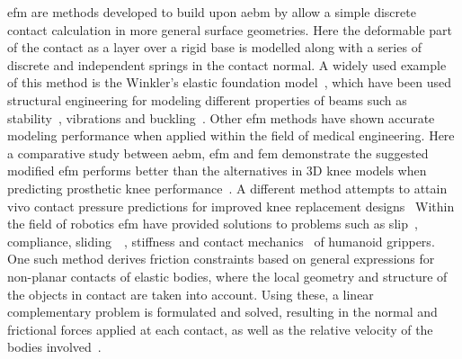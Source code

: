 \gls{efm} are methods developed to build upon \gls{aebm} by allow a simple discrete contact calculation in more general surface geometries. Here the deformable part of the contact as a layer over a rigid base is modelled along with a series of discrete and independent springs in the contact normal. A widely used example of this method is the Winkler's elastic foundation model~\cite{kl-johnson-and-contact-mechanics}, which have been used structural engineering for modeling different properties of beams such as stability~\cite{stability-of-a-timoshenko-beam-resting-on-a-winkler-elastic-foundation}, vibrations and buckling~\cite{vibrations-and-buckling-of-a-beam-on-a-variable-winkler-elastic-foundation}. Other \gls{efm} methods have shown accurate modeling performance when applied within the field of medical engineering. Here a comparative study between \gls{aebm}, \gls{efm} and \gls{fem} demonstrate the suggested modified \gls{efm} performs better than the alternatives in 3D knee models when predicting prosthetic knee performance~\cite{a-modified-elastic-foundation-contact-model-for-application-in-3d-models-of-the-prosthetic-knee}. A different method attempts to attain vivo contact pressure predictions for improved knee replacement designs~\cite{experimental-evaluation-of-an-elastic-foundation-model-to-predict-contact-pressures-in-knee-replacements}
Within the field of robotics \gls{efm} have provided solutions to problems such as slip~\cite{the-sliding-of-robot-fingers-under-combined-torsion-and-shear-loading}, compliance, sliding~\cite{quasistatic-manipulation-with-compliance-and-sliding}~\cite{practical-force-motion-models-for-sliding-manipulation}, stiffness and contact mechanics~\cite{stiffness-and-contact-mechanics-for-soft-fingers-in-grasping-and-manipulation} of humanoid grippers.
One such method derives friction constraints based on general expressions for non-planar contacts of elastic bodies, where the local geometry and structure of the objects in contact are taken into account. Using these, a linear complementary problem is formulated and solved, resulting in the normal and frictional forces applied at each contact, as well as the relative velocity of the bodies involved~\cite{soft-finger-model-with-adaptive-contact-geometry-for-grasping-and-manipulation-tasks}. \medskip

